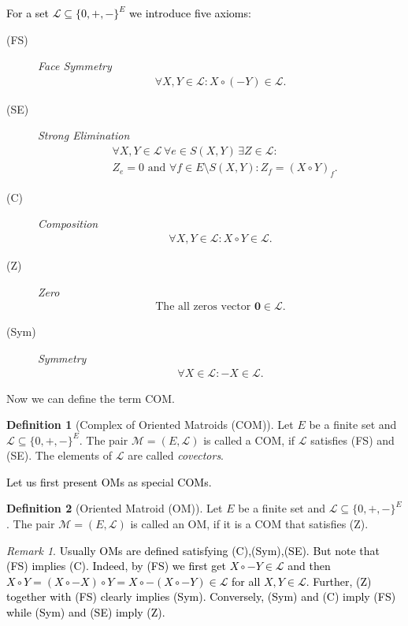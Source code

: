 \documentclass[12pt]{amsart}
\def\M{{\mathcal M}}
\theoremstyle{plain}
\numberwithin{Lemma}{\DefaultNumberTheoremWithin}
\numberwithin{Claim}{\DefaultNumberTheoremWithin}
\numberwithin{Theorem}{\DefaultNumberTheoremWithin}
\numberwithin{Corollary}{\DefaultNumberTheoremWithin}
\numberwithin{Proposition}{\DefaultNumberTheoremWithin}
\numberwithin{Conjecture}{\DefaultNumberTheoremWithin}
\numberwithin{Situation}{\DefaultNumberTheoremWithin}
\numberwithin{Note}{\DefaultNumberTheoremWithin}
\theoremstyle{definition}
\newtheorem{Definition}{Definition}
\numberwithin{Definition}{\DefaultNumberTheoremWithin}
\theoremstyle{definition}
\numberwithin{Question}{\DefaultNumberTheoremWithin}
\theoremstyle{definition}
\numberwithin{Problem}{\DefaultNumberTheoremWithin}
\theoremstyle{remark} \newtheorem{Remark}{Remark}
\numberwithin{Remark}{\DefaultNumberTheoremWithin}
\theoremstyle{remark}
\numberwithin{Example}{\DefaultNumberTheoremWithin}
\numberwithin{Case}{Lemma}
\numberwithin{Step}{Lemma}
\newcommand{\new}[1]{\textcolor{black}{#1}}
\begin{document}
\noindent \new{For a set $\mathcal{L} \subseteq \{0,+,-\}^E$ we introduce five axioms:}
\begin{description}
 
\item[(FS)]\emph{Face Symmetry} 
\begin{align*}
\forall X,Y \in \mathcal{L}: X \circ (-Y) \in \mathcal{L}.
\end{align*}
\item[(SE)]\emph{Strong Elimination} 
\begin{align*}
&\forall X,Y \in \mathcal{L}\, \forall e \in S(X,Y)\, \exists Z \in \mathcal{L}: \\
&Z_e=0 \text{ and }\forall f \in E \setminus S(X,Y): Z_f = (X \circ Y)_f.
\end{align*} 

\item[(C)]\emph{Composition} 
\begin{align*}
\forall X,Y \in \mathcal{L}: X \circ Y \in \mathcal{L}.
\end{align*}

\item[(Z)]\emph{Zero} 
\begin{align*}
\text{The all zeros vector } \mathbf{0} \in \mathcal{L}.
\end{align*}


\item[(Sym)]\emph{Symmetry} 
\begin{align*}
\forall X\in \mathcal{L}: -X\in \mathcal{L}.
\end{align*}

\end{description}
Now we can define the term COM.
\begin{Definition}[Complex of Oriented Matroids (COM)] Let $E$ be a finite set and $\mathcal{L} \subseteq \{0,+,-\}^E$. The pair $\M=(E,\mathcal{L})$ is called a COM, if $\mathcal{L}$ satisfies (FS) and (SE). The elements of $\mathcal{L}$ are called \emph{covectors}.
\end{Definition}


\new{Let us first present OMs as special COMs.}

\begin{Definition}[Oriented Matroid (OM)] Let $E$ be a finite set and $\mathcal{L} \subseteq \{0,+,-\}^E$. The pair $\M=(E,\mathcal{L})$ is called an OM, if it is a COM that satisfies (Z).
\end{Definition}

\begin{Remark}\label{rem:OMs}
\new{Usually OMs are defined satisfying (C),(Sym),(SE). But note that (FS) implies (C). Indeed, by (FS) we first get $X\circ -Y\in\mathcal{L}$ and then $X\circ Y= (X\circ -X)\circ Y= X\circ -(X\circ -Y) \in \mathcal{L}$ for all $X,Y\in \mathcal{L}$. Further, (Z) together with (FS) clearly implies (Sym). Conversely, (Sym) and (C) imply (FS) while (Sym) and (SE) imply (Z).}
\end{Remark}
\end{document}

